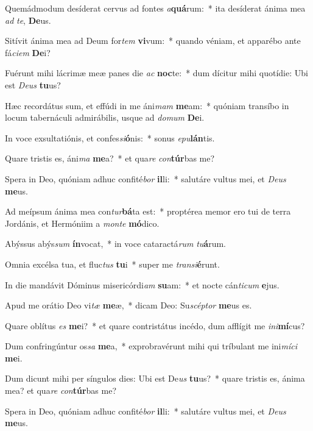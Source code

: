 \item Quemádmodum desíderat cervus ad fontes \textit{a}\textbf{quá}rum:~* ita desíderat ánima mea \textit{ad} \textit{te}, \textbf{De}us.
\item Sitívit ánima mea ad Deum for\textit{tem} \textbf{vi}vum:~* quando véniam, et apparébo ante fá\textit{ci}\textit{em} \textbf{De}i?
\item Fuérunt mihi lácrimæ meæ panes die \textit{ac} \textbf{noc}te:~* dum dícitur mihi quotídie: Ubi est \textit{De}\textit{us} \textbf{tu}us?
\item Hæc recordátus sum, et effúdi in me áni\textit{mam} \textbf{me}am:~* quóniam transíbo in locum tabernáculi admirábilis, usque ad \textit{do}\textit{mum} \textbf{De}i.
\item In voce exsultatiónis, et confes\textit{si}\textbf{ó}nis:~* sonus \textit{e}\textit{pu}\textbf{lán}tis.
\item Quare tristis es, áni\textit{ma} \textbf{me}a?~* et qua\textit{re} \textit{con}\textbf{túr}bas me?
\item Spera in Deo, quóniam adhuc confité\textit{bor} \textbf{il}li:~* salutáre vultus mei, et \textit{De}\textit{us} \textbf{me}us.
\item Ad meípsum ánima mea con\textit{tur}\textbf{bá}ta est:~* proptérea memor ero tui de terra Jordánis, et Hermóniim a \textit{mon}\textit{te} \textbf{mó}dico.
\item Abýssus abýs\textit{sum} \textbf{ín}vocat,~* in voce cataractá\textit{rum} \textit{tu}\textbf{á}rum.
\item Omnia excélsa tua, et fluc\textit{tus} \textbf{tu}i~* super me \textit{trans}\textit{i}\textbf{é}runt.
\item In die mandávit Dóminus misericórdi\textit{am} \textbf{su}am:~* et nocte cán\textit{ti}\textit{cum} \textbf{e}jus.
\item Apud me orátio Deo vi\textit{tæ} \textbf{me}æ,~* dicam Deo: Su\textit{scép}\textit{tor} \textbf{me}us es.
\item Quare oblítus \textit{es} \textbf{me}i?~* et quare contristátus incédo, dum afflígit me \textit{in}\textit{i}\textbf{mí}cus?
\item Dum confringúntur os\textit{sa} \textbf{me}a,~* exprobravérunt mihi qui tríbulant me ini\textit{mí}\textit{ci} \textbf{me}i.
\item Dum dicunt mihi per síngulos dies: Ubi est De\textit{us} \textbf{tu}us?~* quare tristis es, ánima mea? et qua\textit{re} \textit{con}\textbf{túr}bas me?
\item Spera in Deo, quóniam adhuc confité\textit{bor} \textbf{il}li:~* salutáre vultus mei, et \textit{De}\textit{us} \textbf{me}us.
